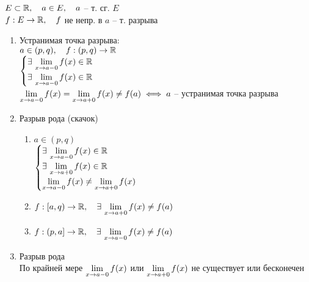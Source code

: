\begin{statement}
	$E \subset \mathbb{R}, \quad a \in E, \quad a$ -- т. сг. $E$ \\
	$f : E \to \mathbb{R}, \quad f$ не непр. в $a$ -- т. разрыва
	\begin{enumerate}
		\item Устранимая точка разрыва: \\
		$a \in (p, q), \quad f : (p, q) \to \mathbb{R} $ \\
		$\begin{cases}
		 	\exists\, \lim\limits_{x \to a-0} f(x) \in \mathbb{R} \\
			\exists\, \lim\limits_{x \to a - 0} f(x) \in \mathbb{R}
		 \end{cases}$ \\
		 $\lim\limits_{x \to a-0} f(x) = \lim\limits_{x \to a + 0} f(x) \ne f(a) \iff a$ -- устранимая точка разрыва
		 \item Разрыв  рода (скачок)
		 \begin{enumerate}
		 	\item $a \in (p, q)$ \\
			$ \begin{cases}
				\exists\, \lim\limits_{x \to a-0} f(x) \in \mathbb{R} \\
				\exists\, \lim\limits_{x \to a +0} f(x) \in \mathbb{R} \\
				\lim\limits_{x \to a -0} f(x) \ne \lim\limits_{x \to a +0} f(x)
			  \end{cases} $
			  \item $f: [a, q) \to \mathbb{R}, \quad \exists\, \lim\limits_{x \to a + 0} f(x) \ne f(a) $
			  \item $f : (p, a] \to \mathbb{R}, \quad \exists\, \lim\limits_{x \to a -0} f(x) \ne f(a) $
		 \end{enumerate}
		\item Разрыв  рода \\
		По крайней мере $\lim\limits_{x \to a-0} f(x) $ или $\lim\limits_{x \to a + 0} f(x)$ не существует или бесконечен
	\end{enumerate}
\end{statement}

\begin{theorem}[о множестве разрывов монотонной функции]
	$$ f : [a, b] \text{ -- монотонна } \implies \forall x_0 \in [a, b] \left[
	\begin{tabular}{l}
		$f$ непрерывна в $ x_0 $ \\
		$f$ имеет разрыв \rom1 рода в $ x_0 $
	\end{tabular} \right. $$
\end{theorem}

